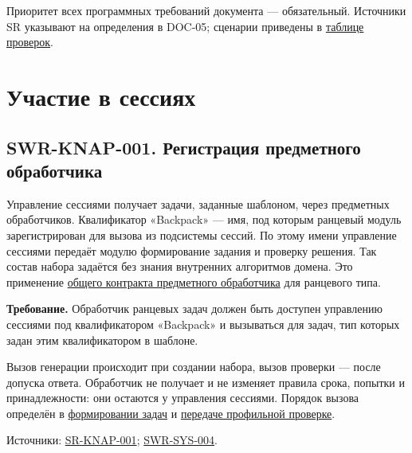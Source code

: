 \documentclass[12pt,a4paper]{article}
\begin{document}
Приоритет всех программных требований документа --- обязательный. Источники SR указывают на определения в DOC-05; сценарии приведены в {\hyperlink{7-трассировка-и-описательные-проверки}{таблице проверок}}.

\section{Участие в сессиях}\label{2-ux443ux447ux430ux441ux442ux438ux435-ux432-ux441ux435ux441ux441ux438ux44fux445}

\hypertarget{2-участие-в-сессиях}{}

\subsection{SWR-KNAP-001. Регистрация предметного обработчика}\label{swr-knap-001-ux440ux435ux433ux438ux441ux442ux440ux430ux446ux438ux44f-ux43fux440ux435ux434ux43cux435ux442ux43dux43eux433ux43e-ux43eux431ux440ux430ux431ux43eux442ux447ux438ux43aux430}

\hypertarget{swr-knap-001-регистрация-предметного-обработчика}{}

\hypertarget{swr-knap-001}{}

Управление сессиями получает задачи, заданные шаблоном, через предметных обработчиков. Квалификатор «Backpack» --- имя, под которым ранцевый модуль зарегистрирован для вызова из подсистемы сессий. По этому имени управление сессиями передаёт модулю формирование задания и проверку решения. Так состав набора задаётся без знания внутренних алгоритмов домена. Это применение {\href{DOC-06\_Программные\_требования.pdf\#swr-sys-004-контракт-предметного-обработчика}{общего контракта предметного обработчика}} для ранцевого типа.

\textbf{Требование.} Обработчик ранцевых задач должен быть доступен управлению сессиями под квалификатором «Backpack» и вызываться для задач, тип которых задан этим квалификатором в шаблоне.

Вызов генерации происходит при создании набора, вызов проверки --- после допуска ответа. Обработчик не получает и не изменяет правила срока, попытки и принадлежности: они остаются у управления сессиями. Порядок вызова определён в {\href{DOC-06.2\_Сессии\_задач\_и\_планировщик.pdf\#swr-ses-004-формирование-задач}{формировании задач}} и {\href{DOC-06.2\_Сессии\_задач\_и\_планировщик.pdf\#swr-ses-010-передача-профильной-проверке}{передаче профильной проверке}}.

Источники: {\href{../04\_Системные\_требования/DOC-05\_Системные\_требования.pdf\#sr-knap-001}{SR-KNAP-001}}; {\href{DOC-06\_Программные\_требования.pdf\#swr-sys-004}{SWR-SYS-004}}.
\end{document}
